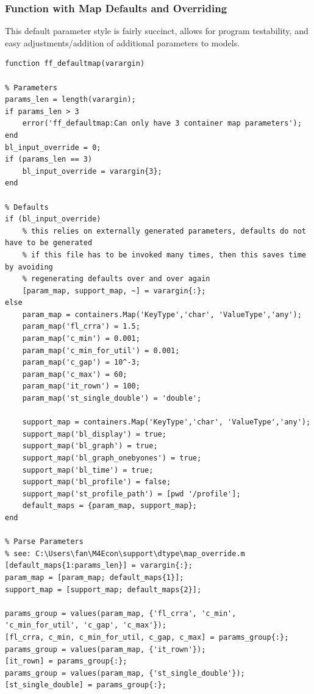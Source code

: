 \documentclass[
]{book}
\begin{document}
\hypertarget{function-with-map-defaults-and-overriding}{%
\subsubsection{Function with Map Defaults and Overriding}\label{function-with-map-defaults-and-overriding}}

This default parameter style is fairly succinct, allows for program
testability, and easy adjustments/addition of additional parameters to
models.

\begin{verbatim}
function ff_defaultmap(varargin)

% Parameters
params_len = length(varargin);
if params_len > 3
    error('ff_defaultmap:Can only have 3 container map parameters');
end
bl_input_override = 0;
if (params_len == 3)
    bl_input_override = varargin{3};
end

% Defaults
if (bl_input_override)
    % this relies on externally generated parameters, defaults do not have to be generated
    % if this file has to be invoked many times, then this saves time by avoiding
    % regenerating defaults over and over again
    [param_map, support_map, ~] = varargin{:};
else    
    param_map = containers.Map('KeyType','char', 'ValueType','any');
    param_map('fl_crra') = 1.5;
    param_map('c_min') = 0.001;
    param_map('c_min_for_util') = 0.001;
    param_map('c_gap') = 10^-3;
    param_map('c_max') = 60;
    param_map('it_rown') = 100;
    param_map('st_single_double') = 'double';
    
    support_map = containers.Map('KeyType','char', 'ValueType','any');
    support_map('bl_display') = true;
    support_map('bl_graph') = true;
    support_map('bl_graph_onebyones') = true;
    support_map('bl_time') = true;
    support_map('bl_profile') = false;
    support_map('st_profile_path') = [pwd '/profile'];
    default_maps = {param_map, support_map};
end

% Parse Parameters
% see: C:\Users\fan\M4Econ\support\dtype\map_override.m
[default_maps{1:params_len}] = varargin{:};
param_map = [param_map; default_maps{1}];
support_map = [support_map; default_maps{2}];

params_group = values(param_map, {'fl_crra', 'c_min', 'c_min_for_util', 'c_gap', 'c_max'});
[fl_crra, c_min, c_min_for_util, c_gap, c_max] = params_group{:};
params_group = values(param_map, {'it_rown'});
[it_rown] = params_group{:};
params_group = values(param_map, {'st_single_double'});
[st_single_double] = params_group{:};


\end{verbatim}
\end{document}
